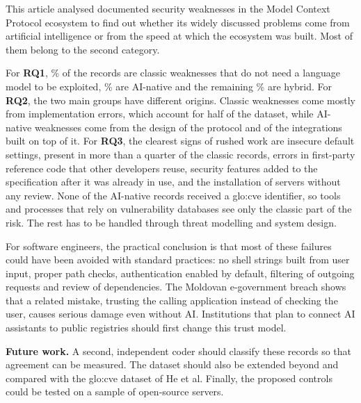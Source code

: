 
\par This article analysed \nRecords{} documented security weaknesses in the Model Context Protocol ecosystem to find out whether its widely discussed problems come from artificial intelligence or from the speed at which the ecosystem was built. Most of them belong to the second category.

\par For \textbf{RQ1}, \pClassic\% of the records are classic weaknesses that do not need a language model to be exploited, \pNative\% are AI-native and the remaining \pHybrid\% are hybrid. For \textbf{RQ2}, the two main groups have different origins. Classic weaknesses come mostly from implementation errors, which account for half of the dataset, while AI-native weaknesses come from the design of the protocol and of the integrations built on top of it. For \textbf{RQ3}, the clearest signs of rushed work are insecure default settings, present in more than a quarter of the classic records, errors in first-party reference code that other developers reuse, security features added to the specification after it was already in use, and the installation of servers without any review. None of the AI-native records received a \acrshort{glo:cve} identifier, so tools and processes that rely on vulnerability databases see only the classic part of the risk. The rest has to be handled through threat modelling and system design.

\par For software engineers, the practical conclusion is that most of these failures could have been avoided with standard practices: no shell strings built from user input, proper path checks, authentication enabled by default, filtering of outgoing requests and review of dependencies. The Moldovan e-government breach shows that a related mistake, trusting the calling application instead of checking the user, causes serious damage even without AI. Institutions that plan to connect AI assistants to public registries should first change this trust model.

\par \textbf{Future work.} A second, independent coder should classify these records so that agreement can be measured. The dataset should also be extended beyond \lastDisclosure{} and compared with the \acrshort{glo:cve} dataset of He et al. Finally, the proposed controls could be tested on a sample of open-source servers.
